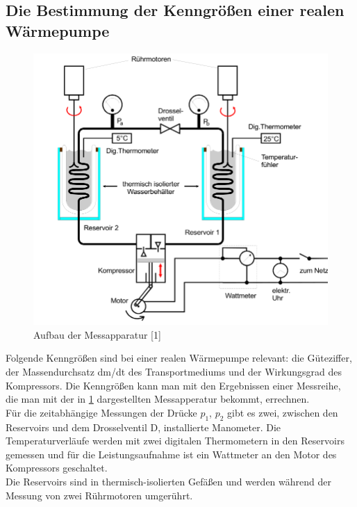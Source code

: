 \subsection{Die Bestimmung der Kenngrößen einer realen Wärmepumpe}
\begin{figure}
    \centering
    \includegraphics[scale=0.5]{aufbau2.pdf}
    \caption{Aufbau der Messapparatur [1]}
    \label{fig:aufbau2}
\end{figure}
Folgende Kenngrößen sind bei einer realen Wärmepumpe relevant: die Güteziffer, der Massendurchsatz dm/dt des Transportmediums und der Wirkungsgrad des Kompressors. Die Kenngrößen kann man mit den 
Ergebnissen einer Messreihe, die man mit der in \ref{fig:aufbau2} dargestellten Messapperatur bekommt, errechnen.\\
Für die zeitabhängige Messungen der Drücke $p_1$, $p_2$ gibt es zwei, zwischen den Reservoirs und dem Drosselventil D, installierte Manometer. Die 
Temperaturverläufe werden mit zwei digitalen Thermometern in den Reservoirs gemessen und für die Leistungsaufnahme ist ein Wattmeter an den Motor des Kompressors geschaltet.\\
Die Reservoirs sind in thermisch-isolierten Gefäßen und werden während der Messung von zwei Rührmotoren umgerührt.\\

